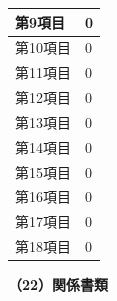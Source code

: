 \documentclass[UTF8,10pt,a4paper,fontset=fandol]{ctexart}
\newcommand{\fieldvalue}[1]{#1}
\newcommand{\handwritten}[1]{#1}
\begin{document}
\begin{tabularx}{\textwidth}{|p{}|X|}
第9項目 &
\fieldvalue{\handwritten{0}} \\
\hline
第10項目 &
\fieldvalue{\handwritten{0}} \\
\hline
第11項目 &
\fieldvalue{\handwritten{0}} \\
\hline
第12項目 &
\fieldvalue{\handwritten{0}} \\
\hline
第13項目 &
\fieldvalue{\handwritten{0}} \\
\hline
第14項目 &
\fieldvalue{\handwritten{0}} \\
\hline
第15項目 &
\fieldvalue{\handwritten{0}} \\
\hline
第16項目 &
\fieldvalue{\handwritten{0}} \\
\hline
第17項目 &
\fieldvalue{\handwritten{0}} \\
\hline
第18項目 &
\fieldvalue{\handwritten{0}} \\
\hline
\end{tabularx}


\newpage

\begin{center}
\textbf{（22）関係書類}
\end{center}
\end{document}
